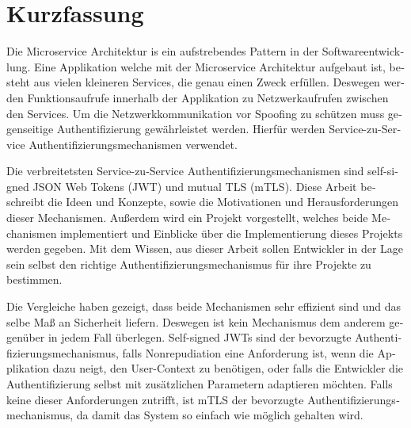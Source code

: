 \chapter{Kurzfassung}

\begin{german}
	Die Microservice Architektur is ein aufstrebendes Pattern in der Softwareentwicklung.
	Eine Applikation welche mit der Microservice Architektur aufgebaut ist, besteht aus vielen kleineren Services, die genau einen Zweck erfüllen.
	Deswegen werden Funktionsaufrufe innerhalb der Applikation zu Netzwerkaufrufen zwischen den Services.
	Um die Netzwerkkommunikation vor Spoofing zu schützen muss gegenseitige Authentifizierung gewährleistet werden.
	Hierfür werden Service-zu-Service Authentifizierungsmechanismen verwendet.

	Die verbreitetsten Service-zu-Service Authentifizierungsmechanismen sind self-signed JSON Web Tokens (JWT) und mutual TLS (mTLS).
	Diese Arbeit beschreibt die Ideen und Konzepte, sowie die Motivationen und Herausforderungen dieser Mechanismen.
	Außerdem wird ein Projekt vorgestellt, welches beide Mechanismen implementiert und Einblicke über die Implementierung dieses Projekts werden gegeben.
	Mit dem Wissen, aus dieser Arbeit sollen Entwickler in der Lage sein selbst den richtige Authentifizierungsmechanismus für ihre Projekte zu bestimmen.

	Die Vergleiche haben gezeigt, dass beide Mechanismen sehr effizient sind und das selbe Maß an Sicherheit liefern.
	Deswegen ist kein Mechanismus dem anderem gegenüber in jedem Fall überlegen.
	Self-signed JWTs sind der bevorzugte Authentifizierungsmechanismus, falls Nonrepudiation eine Anforderung ist, wenn die Applikation dazu neigt, den User-Context zu benötigen, oder falls die Entwickler die Authentifizierung selbst mit zusätzlichen Parametern adaptieren möchten.
	Falls keine dieser Anforderungen zutrifft, ist mTLS der bevorzugte Authentifizierungsmechanismus, da damit das System so einfach wie möglich gehalten wird.
\end{german}
